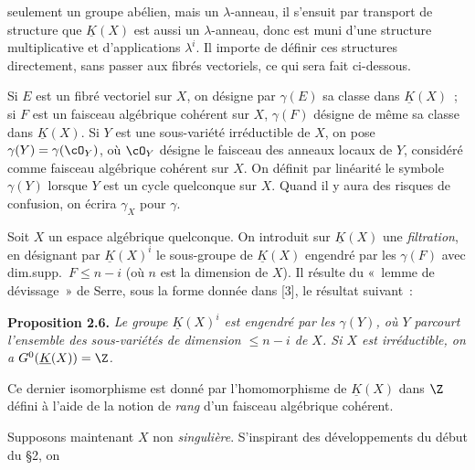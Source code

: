 seulement un groupe abélien, mais un $\lambda$-anneau, il s'ensuit par transport de structure que $\underline{K}(X)$ est aussi un $\lambda$-anneau, donc est muni d'une structure multiplicative et d'applications $\lambda^i$. Il importe de définir ces structures directement, sans passer aux fibrés vectoriels, ce qui sera fait ci-dessous.

Si $E$ est un fibré vectoriel sur $X$, on désigne par $\gamma(E)$ sa classe dans $\underline{K}(X)$~; si $F$ est un faisceau algébrique cohérent sur $X$, $\gamma(F)$ désigne de même sa classe dans $\underline{K}(X)$. Si $Y$ est une sous-variété irréductible de $X$, on pose $\gamma(Y)=\gamma(\cO_Y)$, où $\cO_Y$ désigne le faisceau des anneaux locaux de $Y$, considéré comme faisceau algébrique cohérent sur $X$. On définit par linéarité le symbole $\gamma(Y)$ lorsque $Y$ est un cycle quelconque sur $X$. Quand il y aura des risques de confusion, on écrira $\gamma_X$ pour $\gamma$.

Soit $X$ un espace algébrique quelconque. On introduit sur $\underline{K}(X)$ une \emph{filtration}, en désignant par $\underline{K}(X)^i$ le sous-groupe de $\underline{K}(X)$ engendré par les $\gamma(F)$ avec dim.supp.\ $F\leq n-i$ (où $n$ est la dimension de $X$). Il résulte du «~lemme de dévissage~» de Serre, sous la forme donnée dans [3], le résultat suivant~:

\textbf{Proposition 2.6.} \emph{Le groupe $\underline{K}(X)^i$ est engendré par les $\gamma(Y)$, où $Y$ parcourt l'ensemble des sous-variétés de dimension $\leq n-i$ de $X$. Si $X$ est irréductible, on a $G^0(\underline{K}(X))=\Z$.}

Ce dernier isomorphisme est donné par l'homomorphisme de $\underline{K}(X)$ dans $\Z$ défini à l'aide de la notion de \emph{rang} d'un faisceau algébrique cohérent.

Supposons maintenant $X$ non \emph{singulière}. S'inspirant des développements du début du \S 2, on
